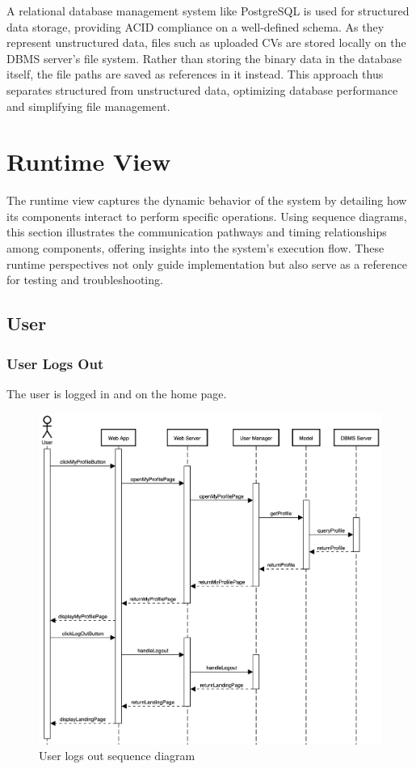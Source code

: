 A relational database management system like PostgreSQL is used for structured data storage, providing ACID compliance on a well-defined schema.
As they represent unstructured data, files such as uploaded CVs are stored locally on the DBMS server’s file system.
Rather than storing the binary data in the database itself, the file paths are saved as references in it instead.
This approach thus separates structured from unstructured data, optimizing database performance and simplifying file management.

\section{Runtime View}
The runtime view captures the dynamic behavior of the system by detailing how its components interact to perform specific operations.
Using sequence diagrams, this section illustrates the communication pathways and timing relationships among components, offering insights into the system's execution flow.
These runtime perspectives not only guide implementation but also serve as a reference for testing and troubleshooting.

\newpage
\subsection{User}
\subsubsection{User Logs Out}
The user is logged in and on the home page.

\begin{figure}[h]
    \centering
    \includegraphics[width=16cm]{images/sequence-diagrams/user-logs-out.png}
    \caption{User logs out sequence diagram}
\end{figure}

